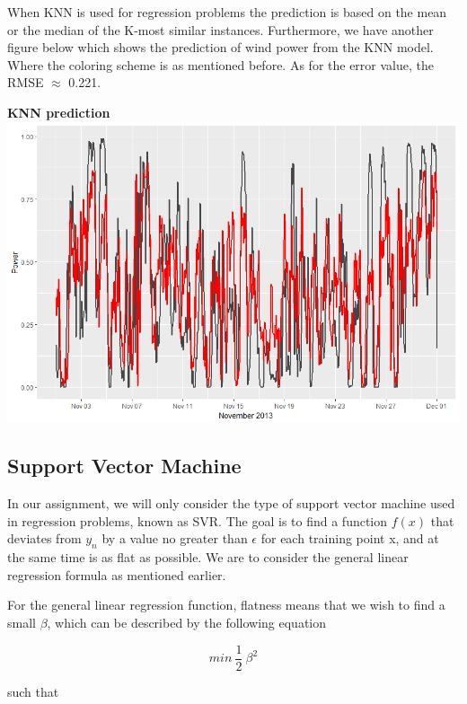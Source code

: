 \documentclass[
11pt, %
english, %
singlespacing, %
parskip, %
headsepline, %
]{report} %
\begin{document}
    When KNN is used for regression problems the prediction is based on the mean or the median of the K-most similar instances. Furthermore, we have another figure below which shows the prediction of wind power from the KNN model. Where the coloring scheme is as mentioned before. As for the error value, the RMSE $\approx$ 0.221.
    
    \begin{center}
        \textbf{KNN prediction}\\
	\includegraphics[scale=0.3, width=\textwidth]{figures/Rplot_KNN.png}\\[1cm]
    \end{center}
    
    
\subsection{Support Vector Machine}
    In our assignment, we will only consider the type of support vector machine used in regression problems, known as SVR. The goal is to find a function $f(x)$ that deviates from $y_{n}$ by a value no greater than $\epsilon$ for each training point x, and at the same time is as flat as possible. We are to consider the general linear regression formula as mentioned earlier.
    
    For the general linear regression function, flatness means that we wish to find a small $\beta$, which can be described by the following equation
    
    \begin{equation}
        min\ \frac{1}{2}\ \beta^2
    \end{equation}
    
    such that
    
\end{document}
